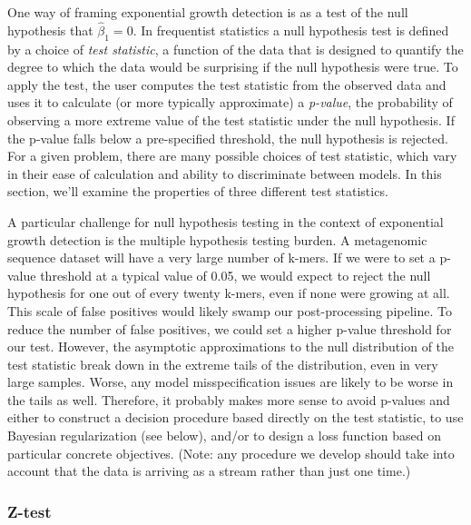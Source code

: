 \documentclass[12pt, letterpaper]{article}
\begin{document}
One way of framing exponential growth detection is as a test of the null hypothesis that $\hat{\beta}_1 = 0$.
In frequentist statistics a null hypothesis test is defined by a choice of \emph{test statistic}, a function of the data that is designed to quantify the degree to which the data would be surprising if the null hypothesis were true.
To apply the test, the user computes the test statistic from the observed data and uses it to calculate (or more typically approximate) a \emph{p-value}, the probability of observing a more extreme value of the test statistic under the null hypothesis.
If the p-value falls below a pre-specified threshold, the null hypothesis is rejected.
For a given problem, there are many possible choices of test statistic, which vary in their ease of calculation and ability to discriminate between models.
In this section, we'll examine the properties of three different test statistics.

A particular challenge for null hypothesis testing in the context of exponential growth detection is the multiple hypothesis testing burden.
A metagenomic sequence dataset will have a very large number of k-mers.
If we were to set a p-value threshold at a typical value of 0.05, we would expect to reject the null hypothesis for one out of every twenty k-mers, even if none were growing at all.
This scale of false positives would likely swamp our post-processing pipeline.
To reduce the number of false positives, we could set a higher p-value threshold for our test.
However, the asymptotic approximations to the null distribution of the test statistic break down in the extreme tails of the distribution, even in very large samples.
Worse, any model misspecification issues are likely to be worse in the tails as well.
Therefore, it probably makes more sense to avoid p-values and either to construct a decision procedure based directly on the test statistic, to use Bayesian regularization (see below), and/or to design a loss function based on particular concrete objectives.
(Note: any procedure we develop should take into account that the data is arriving as a stream rather than just one time.)

\subsubsection{Z-test}
\end{document}
